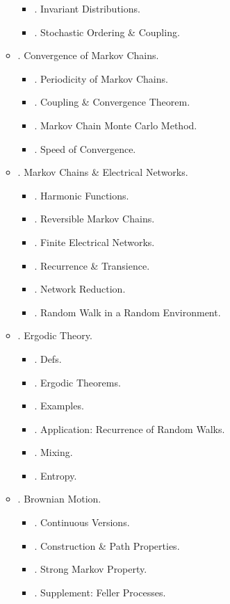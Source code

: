 \documentclass{article}
\begin{document}
\begin{enumerate}
\begin{itemize}
\begin{itemize}
			\item {. Invariant Distributions.}
			\item {. Stochastic Ordering \& Coupling.}
		\end{itemize}
		\item {. Convergence of Markov Chains.}
		\begin{itemize}
			\item {. Periodicity of Markov Chains.}
			\item {. Coupling \& Convergence Theorem.}
			\item {. Markov Chain Monte Carlo Method.}
			\item {. Speed of Convergence.}
		\end{itemize}
		\item {. Markov Chains \& Electrical Networks.}
		\begin{itemize}
			\item {. Harmonic Functions.}
			\item {. Reversible Markov Chains.}
			\item {. Finite Electrical Networks.}
			\item {. Recurrence \& Transience.}
			\item {. Network Reduction.}
			\item {. Random Walk in a Random Environment.}
		\end{itemize}
		\item {. Ergodic Theory.}
		\begin{itemize}
			\item {. Defs.}
			\item {. Ergodic Theorems.}
			\item {. Examples.}
			\item {. Application: Recurrence of Random Walks.}
			\item {. Mixing.}
			\item {. Entropy.}
		\end{itemize}
		\item {. Brownian Motion.}
		\begin{itemize}
			\item {. Continuous Versions.}
			\item {. Construction \& Path Properties.}
			\item {. Strong Markov Property.}
			\item {. Supplement: Feller Processes.}

\end{itemize}
\end{itemize}
\end{enumerate}
\end{document}

